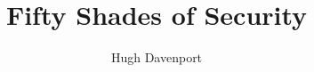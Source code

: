 \documentclass[12pt, a4paper, twoside, openright]{book}
\begin{document}
\frontmatter


\title{Fifty Shades of Security}
\author{Hugh Davenport}

\subject{Security Engineering}








\maketitle



\tableofcontents

\listoffigures

\listoftables

 


\mainmatter














%


\end{document}
